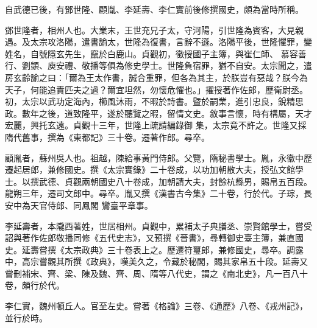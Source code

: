 \begin{pinyinscope}
 自武德已後，有鄧世隆、顧胤、李延壽、李仁實前後修撰國史，頗為當時所稱。



 鄧世隆者，相州人也。大業末，王世充兄子太，守河陽，引世隆為賓客，大見親遇。及太宗攻洛陽，遣書諭太，世隆為復書，言辭不遜。洛陽平後，世隆懼罪，變姓名，自號隱玄先生，竄於白鹿山。貞觀初，徵授國子主簿，與崔仁師、
 慕容善行、劉顗、庾安禮、敬播等俱為修史學士。世隆負宿罪，猶不自安。太宗聞之，遣房玄齡諭之曰：「爾為王太作書，誠合重罪，但各為其主，於朕豈有惡哉？朕今為天子，何能追責匹夫之過？爾宜坦然，勿懷危懼也。」擢授著作佐郎，歷衛尉丞。初，太宗以武功定海內，櫛風沐雨，不暇於詩書。暨於嗣業，進引忠良，銳精思政。數年之後，道致隆平，遂於聽覽之暇，留情文史。敘事言懷，時有構屬，天才宏麗，興托玄遠。貞觀十三年，世隆上疏請編錄御
 集，太宗竟不許之。世隆又採隋代舊事，撰為《東都記》三十卷。遷著作郎。尋卒。



 顧胤者，蘇州吳人也。祖越，陳給事黃門侍郎。父覽，隋秘書學士。胤，永徽中歷遷起居郎，兼修國史。撰《太宗實錄》二十卷成，以功加朝散大夫，授弘文館學士。以撰武德、貞觀兩朝國史八十卷成，加朝請大夫，封餘杭縣男，賜帛五百段。龍朔三年，遷司文郎中。尋卒。胤又撰《漢書古今集》二十卷，行於代。子琮，長安中為天官侍郎、同鳳閣
 鸞臺平章事。



 李延壽者，本隴西著姓，世居相州。貞觀中，累補太子典膳丞、崇賢館學士，嘗受詔與著作佐郎敬播同修《五代史志》，又預撰《晉書》，尋轉御史臺主簿，兼直國史。延壽嘗撰《太宗政典》三十卷表上之。歷遷符璽郎，兼修國史，尋卒。調露中，高宗嘗觀其所撰《政典》，嘆美久之，令藏於秘閣，賜其家帛五十段。延壽又嘗刪補宋、齊、梁、陳及魏、齊、周、隋等八代史，謂之《南北史》，凡一百八十卷，頗行於代。



 李仁實，魏州頓丘人。官至左史。嘗著《格論》三卷、《通歷》八卷、《戎州記》，並行於時。




\end{pinyinscope}

